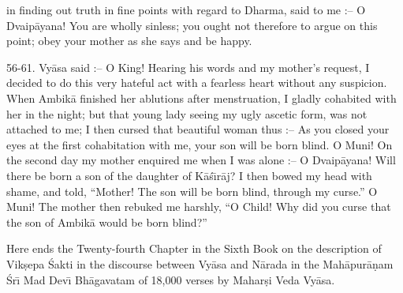 in finding out truth in fine points with regard to Dharma, said to me :-- O Dvaip\=ayana! You are wholly sinless; you ought not therefore to argue on this point; obey your mother as she says and be happy.

56-61. Vy\=asa said :-- O King! Hearing his words and my mother's request, I decided to do this very hateful act with a fearless heart without any suspicion. When Ambik\=a finished her ablutions after menstruation, I gladly cohabited with her in the night; but that young lady seeing my ugly ascetic form, was not attached to me; I then cursed that beautiful woman thus :-- As you closed your eyes at the first cohabitation with me, your son will be born blind. O Muni! On the second day my mother enquired me when I was alone :-- O Dvaip\=ayana! Will there be born a son of the daughter of K\=a\'s\={\i}r\=aj? I then bowed my head with shame, and told, ``Mother! The son will be born blind, through my curse.'' O Muni! The mother then rebuked me harshly, ``O Child! Why did you curse that the son of Ambik\=a would be born blind?''

Here ends the Twenty-fourth Chapter in the Sixth Book on the description of Vik\d{s}epa \'Sakti in the discourse between Vy\=asa and N\=arada in the Mah\=apur\=a\d{n}am \'Sr\={\i} Mad Dev\={\i} Bh\=agavatam of 18,000 verses by Mahar\d{s}i Veda Vy\=asa.



